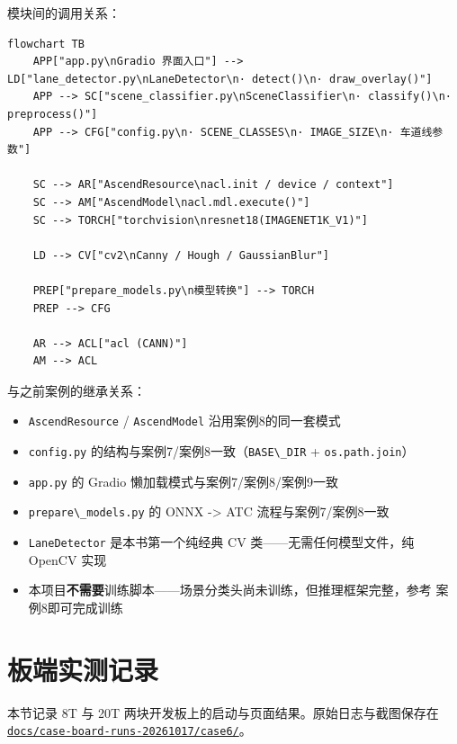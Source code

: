 模块间的调用关系：

\begin{lstlisting}
flowchart TB
    APP["app.py\nGradio 界面入口"] --> LD["lane_detector.py\nLaneDetector\n· detect()\n· draw_overlay()"]
    APP --> SC["scene_classifier.py\nSceneClassifier\n· classify()\n· preprocess()"]
    APP --> CFG["config.py\n· SCENE_CLASSES\n· IMAGE_SIZE\n· 车道线参数"]

    SC --> AR["AscendResource\nacl.init / device / context"]
    SC --> AM["AscendModel\nacl.mdl.execute()"]
    SC --> TORCH["torchvision\nresnet18(IMAGENET1K_V1)"]

    LD --> CV["cv2\nCanny / Hough / GaussianBlur"]

    PREP["prepare_models.py\n模型转换"] --> TORCH
    PREP --> CFG

    AR --> ACL["acl (CANN)"]
    AM --> ACL
\end{lstlisting}

与之前案例的继承关系：

\begin{itemize}
\tightlist
\item
  \passthrough{\lstinline!AscendResource!} /
  \passthrough{\lstinline!AscendModel!} 沿用案例8的同一套模式
\item
  \passthrough{\lstinline!config.py!}
  的结构与案例7/案例8一致（\passthrough{\lstinline!BASE\_DIR!} +
  \passthrough{\lstinline!os.path.join!}）
\item
  \passthrough{\lstinline!app.py!} 的 Gradio
  懒加载模式与案例7/案例8/案例9一致
\item
  \passthrough{\lstinline!prepare\_models.py!} 的 ONNX -\textgreater{}
  ATC 流程与案例7/案例8一致
\item
  \passthrough{\lstinline!LaneDetector!} 是本书第一个纯经典 CV
  类------无需任何模型文件，纯 OpenCV 实现
\item
  本项目\textbf{不需要}训练脚本------场景分类头尚未训练，但推理框架完整，参考
  案例8即可完成训练
\end{itemize}

\section{板端实测记录}\label{src-experiment-case6-board-evidence}

本节记录 8T 与 20T 两块开发板上的启动与页面结果。原始日志与截图保存在
\href{https://github.com/zhouxzh/Ascend310/blob/main/docs/case-board-runs-20261017/case6/README.md}{\passthrough{\lstinline!docs/case-board-runs-20261017/case6/!}}。

